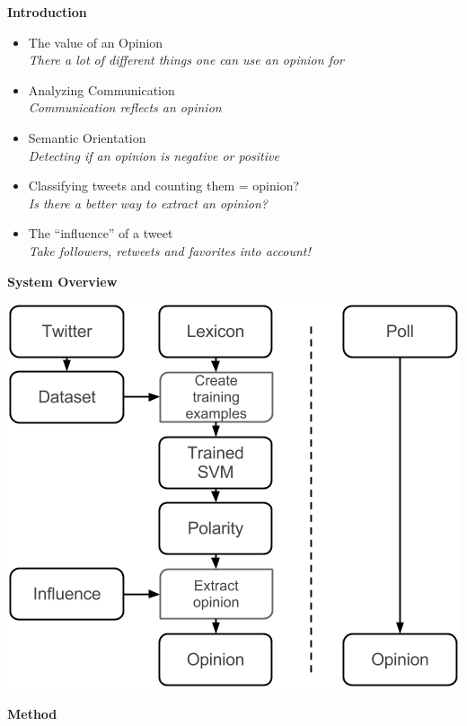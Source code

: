 \documentclass[landscape,20pt]{extarticle}
\newcommand*{\TitleFont}{\Huge \bf}
\newcommand*{\TextFont}{\normalsize \it}
\begin{document}
\thispagestyle{empty}
\Large
{\TitleFont Introduction}

\begin{itemize}
\item The value of an Opinion\\
{\TextFont There a lot of different things one can use an opinion for}
\item Analyzing Communication\\
{\TextFont Communication reflects an opinion}
\item Semantic Orientation\\
{\TextFont Detecting if an opinion is negative or positive}
\item Classifying tweets and counting them = opinion?\\
{\TextFont Is there a better way to extract an opinion?}
\item The ``influence'' of a tweet\\
{\TextFont Take followers, retweets and favorites into account!}
\end{itemize}

\clearpage
\thispagestyle{empty}

{\TitleFont System Overview}
\newline
\centerline{\includegraphics[scale=1]{../img/Overview.png}}

\clearpage
\thispagestyle{empty}

{\TitleFont Method}
\end{document}
